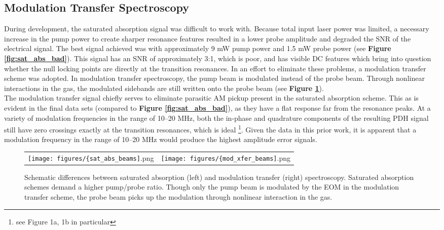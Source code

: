 
\subsection{Modulation Transfer Spectroscopy}

During development, the saturated absorption signal was difficult to work with. Because total input laser power was limited, a necessary increase in the pump power to create sharper resonance features resulted in a lower probe amplitude and degraded the SNR of the electrical signal. The best signal achieved was with approximately 9 mW pump power and 1.5 mW probe power (see \textbf{Figure \ref{fig:sat_abs_bad}}). This signal has an SNR of approximately 3:1, which is poor, and has visible DC features which bring into question whether the null locking points are directly at the transition resonances. In an effort to eliminate these problems, a modulation transfer scheme was adopted. In modulation transfer spectroscopy, the pump beam is modulated instead of the probe beam. Through nonlinear interactions in the gas, the modulated sidebands are still written onto the probe beam (see \textbf{Figure \ref{fig:spectroscopies}}).   \\

The modulation transfer signal chiefly serves to eliminate parasitic AM pickup present in the saturated absorption scheme. This as is evident in the final data sets (compared to \textbf{Figure \ref{fig:sat_abs_bad}}), as they have a flat response far from the resonance peaks. At a variety of modulation frequencies in the range of 10--20 MHz, both the in-phase and quadrature components of the resulting PDH signal still have zero crossings exactly at the transition resonances, which is ideal \cite{0957-0233-19-10-105601}\footnote{see Figure 1a, 1b in particular}. Given the data in this prior work, it is apparent that a modulation frequency in the range of 10--20 MHz would produce the highest amplitude error signals.

\begin{figure}
  \begin{tabular}{ >{\centering\arraybackslash} m{} >{\centering\arraybackslash} m{} }
    \texttt{[image: figures/\{sat\_abs\_beams]}.png} &
    \texttt{[image: figures/\{mod\_xfer\_beams]}.png} \\
  \end{tabular}
  \caption[Differences between saturated absorption and modulation transfer spectroscopy]{Schematic differences between saturated absorption (left) and modulation transfer (right) spectroscopy. Saturated absorption schemes demand a higher pump/probe ratio. Though only the pump beam is modulated by the EOM in the modulation transfer scheme, the probe beam picks up the modulation through nonlinear interaction in the gas.}
  \label{fig:spectroscopies}
\end{figure}